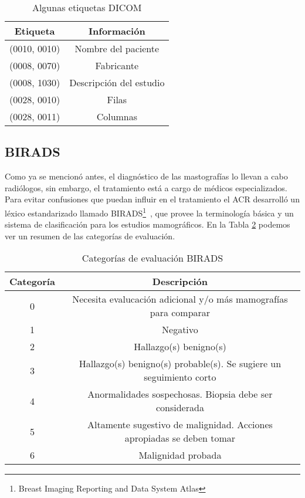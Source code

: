 \begin{table}
  \caption[Etiquetas DICOM]{Algunas etiquetas DICOM} 
  \label{dicom:tags}
\begin{center}
{\small
    \begin{tabular}{c|c}
    \hline
    {\bf Etiqueta} & 
    {\bf Información} \\
    \hline
    (0010, 0010) & Nombre del paciente\\
    (0008, 0070) & Fabricante\\
    (0008, 1030) & Descripción del estudio\\
    (0028, 0010) & Filas\\
    (0028, 0011) & Columnas\\
    \hline
    \end{tabular}
}
\end{center}
\end{table}

\subsection{BIRADS}

Como ya se mencionó antes, el diagnóstico de las mastografías lo llevan a cabo
radiólogos, sin embargo, el tratamiento está a cargo de médicos especializados.
Para evitar confusiones que puedan influir en el tratamiento el ACR desarrolló
un léxico estandarizado llamado BIRADS\footnote{Breast Imaging Reporting and
Data System Atlas}~\cite{reston2003birads}, que provee la terminología básica
y un sistema de clasificación para los estudios mamográficos. En la Tabla
\ref{birads} podemos ver un resumen de las categorías de evaluación.

\begin{table}
  \caption[Categorías de evaluación BIRADS]{Categorías de evaluación BIRADS}
  \label{birads}
\begin{center}
{\small
    \begin{tabular}{c|c}
    \hline
    {\bf Categoría} & 
    {\bf Descripción} \\
    \hline
    0 & Necesita evalucación adicional y/o más mamografías para comparar\\
    1 & Negativo\\
    2 & Hallazgo(s) benigno(s)\\
    3 & Hallazgo(s) benigno(s) probable(s). Se sugiere un seguimiento corto\\
    4 & Anormalidades sospechosas. Biopsia debe ser considerada \\
    5 & Altamente sugestivo de malignidad. Acciones apropiadas se deben tomar\\
    6 & Malignidad probada\\
    \hline
    \end{tabular}
}
\end{center}
\end{table}

